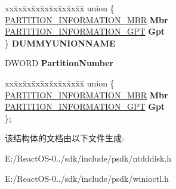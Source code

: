 \begin{DoxyCompactItemize}
\mbox{\label{struct___p_a_r_t_i_t_i_o_n___i_n_f_o_r_m_a_t_i_o_n___e_x_a31e4f3c833ab06586ef2b68d72f19113}} 
\begin{tabbing}
xx\=xx\=xx\=xx\=xx\=xx\=xx\=xx\=xx\=\kill
union \{\\
\>\hyperlink{struct___p_a_r_t_i_t_i_o_n___i_n_f_o_r_m_a_t_i_o_n___m_b_r}{PARTITION\_INFORMATION\_MBR} {\bfseries Mbr}\\
\>\hyperlink{struct___p_a_r_t_i_t_i_o_n___i_n_f_o_r_m_a_t_i_o_n___g_p_t}{PARTITION\_INFORMATION\_GPT} {\bfseries Gpt}\\
\} {\bfseries DUMMYUNIONNAME}\\

\end{tabbing}\item 
\mbox{\label{struct___p_a_r_t_i_t_i_o_n___i_n_f_o_r_m_a_t_i_o_n___e_x_a4cd6648ab5909b6cc0ecae92fba9cc3e}} 
D\+W\+O\+RD {\bfseries Partition\+Number}
\item 
\mbox{\label{struct___p_a_r_t_i_t_i_o_n___i_n_f_o_r_m_a_t_i_o_n___e_x_aece0ae8f0b86911d2932be82d5f64173}} 
\begin{tabbing}
xx\=xx\=xx\=xx\=xx\=xx\=xx\=xx\=xx\=\kill
union \{\\
\>\hyperlink{struct___p_a_r_t_i_t_i_o_n___i_n_f_o_r_m_a_t_i_o_n___m_b_r}{PARTITION\_INFORMATION\_MBR} {\bfseries Mbr}\\
\>\hyperlink{struct___p_a_r_t_i_t_i_o_n___i_n_f_o_r_m_a_t_i_o_n___g_p_t}{PARTITION\_INFORMATION\_GPT} {\bfseries Gpt}\\
\}; \\

\end{tabbing}\end{DoxyCompactItemize}


该结构体的文档由以下文件生成\+:\begin{DoxyCompactItemize}
\item 
E\+:/\+React\+O\+S-\/0../sdk/include/psdk/ntdddisk.\+h\item 
E\+:/\+React\+O\+S-\/0../sdk/include/psdk/winioctl.\+h\end{DoxyCompactItemize}

